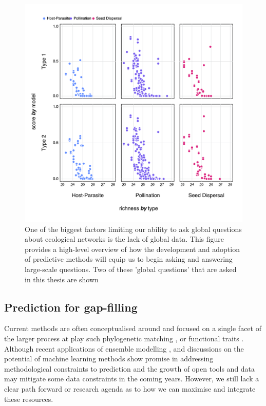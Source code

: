 \begin{figure}[h]
    \centering
    \includegraphics[width=\textwidth]{figures/nullmodel_richness.png}
    \caption{One of the biggest factors limiting our ability to ask global questions about ecological networks is the lack of global data. This figure provides a high-level overview of how the development and adoption of predictive methods will equip us to begin asking and answering large-scale questions. Two of these 'global questions' that are asked in this thesis are shown}
    \label{fig:plan}
\end{figure}

\subsection{Prediction for gap-filling}

Current methods are often conceptualised around and focused on a single facet of the
larger process at play such phylogenetic matching
\cite{Pomeranz2018InfPre, Elmasri2020HieBay}, or functional traits
\cite{Bartomeus2016ComFra}. Although recent applications of ensemble
modelling \cite{Becker2020PreWil}, and discussions on the potential of
machine learning methods \cite{Desjardins-Proulx2019ArtInt} show promise
in addressing methodological constraints to prediction and the growth of
open tools and data may mitigate some data constraints in the coming
years. However, we still lack a clear path forward or research agenda as
to how we can maximise and integrate these resources.

